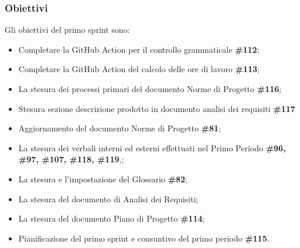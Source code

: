 \subsubsection{Obiettivi}

Gli obiettivi del primo sprint sono:
\begin{itemize}
    \item Completare la GitHub Action per il controllo grammaticale \textbf{\#112};
    \item Completare la GitHub Action del calcolo delle ore di lavoro \textbf{\#113};
    \item La stesura dei processi primari del documento Norme di Progetto \textbf{\#116};
    \item Stesura sezione descrizione prodotto in documento analisi dei requisiti \textbf{\#117}
    \item Aggiornamento del documento Norme di Progetto \textbf{\#81};
    \item La stesura dei verbali interni ed esterni effettuati nel Primo Periodo \textbf{\#96, \#97, \#107, \#118, \#119},;
    \item La stesura e l'impostazione del Glossario \textbf{\#82};
    \item La stesura del documento di Analisi dei Requisiti;
    \item La stesura del documento Piano di Progetto \textbf{\#114};
    \item Pianificazione del primo sprint e consuntivo del primo periodo \textbf{\#115}.
\end{itemize}
